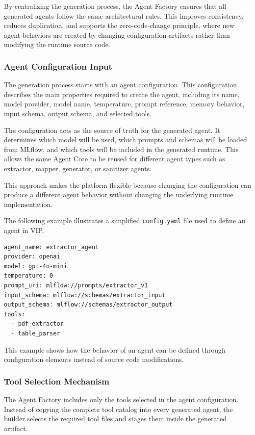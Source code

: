 By centralizing the generation process, the Agent Factory ensures that all generated agents follow the same architectural rules. This improves consistency, reduces duplication, and supports the zero-code-change principle, where new agent behaviors are created by changing configuration artifacts rather than modifying the runtime source code.

\subsubsection{Agent Configuration Input}

The generation process starts with an agent configuration. This configuration describes the main properties required to create the agent, including its name, model provider, model name, temperature, prompt reference, memory behavior, input schema, output schema, and selected tools.

The configuration acts as the source of truth for the generated agent. It determines which model will be used, which prompts and schemas will be loaded from MLflow, and which tools will be included in the generated runtime. This allows the same Agent Core to be reused for different agent types such as extractor, mapper, generator, or sanitizer agents.

This approach makes the platform flexible because changing the configuration can produce a different agent behavior without changing the underlying runtime implementation.

The following example illustrates a simplified \texttt{config.yaml} file used to define an agent in VIP.

\begin{verbatim}
agent_name: extractor_agent
provider: openai
model: gpt-4o-mini
temperature: 0
prompt_uri: mlflow://prompts/extractor_v1
input_schema: mlflow://schemas/extractor_input
output_schema: mlflow://schemas/extractor_output
tools:
  - pdf_extractor
  - table_parser
\end{verbatim}

This example shows how the behavior of an agent can be defined through configuration elements instead of source code modifications.

\subsubsection{Tool Selection Mechanism}

The Agent Factory includes only the tools selected in the agent configuration. Instead of copying the complete tool catalog into every generated agent, the builder selects the required tool files and stages them inside the generated artifact.

